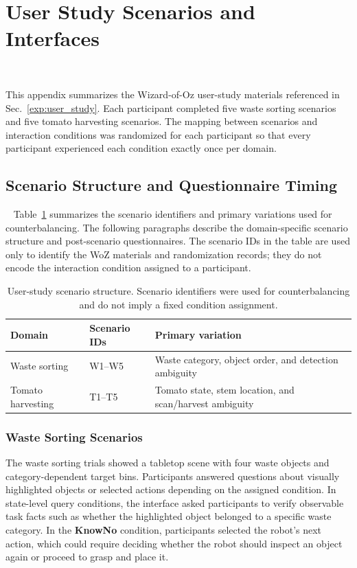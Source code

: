 \section{User Study Scenarios and Interfaces}~\label{appx:user}

This appendix summarizes the Wizard-of-Oz user-study materials referenced in Sec.~\ref{exp:user_study}. Each participant completed five waste sorting scenarios and five tomato harvesting scenarios. The mapping between scenarios and interaction conditions was randomized for each participant so that every participant experienced each condition exactly once per domain.

\subsection{Scenario Structure and Questionnaire Timing}~\label{appx:user_scenarios}
Table~\ref{tab:app_user_scenarios} summarizes the scenario identifiers and primary variations used for counterbalancing. The following paragraphs describe the domain-specific scenario structure and post-scenario questionnaires.
The scenario IDs in the table are used only to identify the WoZ materials and randomization records; they do not encode the interaction condition assigned to a participant.

\begin{table}[h]
\centering
\caption{User-study scenario structure. Scenario identifiers were used for counterbalancing and do not imply a fixed condition assignment.}
\label{tab:app_user_scenarios}
\small
\begin{tabular}{lll}
\toprule
\textbf{Domain} & \textbf{Scenario IDs} & \textbf{Primary variation} \\
\midrule
Waste sorting & W1--W5 & Waste category, object order, and detection ambiguity \\
Tomato harvesting & T1--T5 & Tomato state, stem location, and scan/harvest ambiguity \\
\bottomrule
\end{tabular}
\end{table}

\subsubsection{Waste Sorting Scenarios}
The waste sorting trials showed a tabletop scene with four waste objects and category-dependent target bins. Participants answered questions about visually highlighted objects or selected actions depending on the assigned condition. In state-level query conditions, the interface asked participants to verify observable task facts such as whether the highlighted object belonged to a specific waste category. In the \textbf{KnowNo} condition, participants selected the robot's next action, which could require deciding whether the robot should inspect an object again or proceed to grasp and place it.

